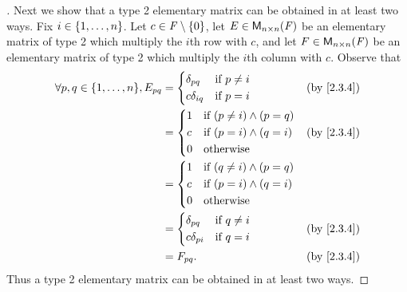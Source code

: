 \begin{proof}[]
	Next we show that a type 2 elementary matrix can be obtained in at least two ways.
	Fix \(i \in \left\lbrace1, \dots, n\right\rbrace\).
	Let \(c \in \mathit{F} \setminus \left\lbrace0\right\rbrace\), let \(E \in \mathsf{M}_{{n} \times n}({\mathit{F}})\) be an elementary matrix of type 2 which multiply the \(i\)th row with \(c\), and let \(F \in \mathsf{M}_{{n} \times n}({\mathit{F}})\) be an elementary matrix of type 2 which multiply the \(i\)th column with \(c\).
	Observe that
	\begin{align*}
		\forall p, q \in \set{1, \dots, n}, E_{p q} & = \begin{dcases}
			                                                \delta_{p q}   & \text{if } p \neq i \\
			                                                c \delta_{i q} & \text{if } p = i
		                                                \end{dcases}    &  & \by{2.3.4}                     \\
		                                            & = \begin{dcases}
			                                                1 & \text{if } (p \neq i) \land (p = q) \\
			                                                c & \text{if } (p = i) \land (q = i)    \\
			                                                0 & \text{otherwise}
		                                                \end{dcases} &  & \by{2.3.4}                  \\
		                                            & = \begin{dcases}
			                                                1 & \text{if } (q \neq i) \land (p = q) \\
			                                                c & \text{if } (p = i) \land (q = i)    \\
			                                                0 & \text{otherwise}
		                                                \end{dcases}                  \\
		                                            & = \begin{dcases}
			                                                \delta_{p q}   & \text{if } q \neq i \\
			                                                c \delta_{p i} & \text{if } q = i
		                                                \end{dcases}    &  & \by{2.3.4}                     \\
		                                            & = F_{p q}.                                 &  & \by{2.3.4}
	\end{align*}
	Thus a type 2 elementary matrix can be obtained in at least two ways.


\end{proof}
